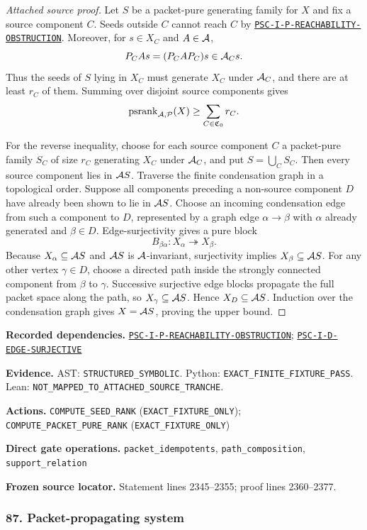 \documentclass[a4paper,11pt]{article}
\newcommand{\field}[2]{\noindent\textbf{#1.} #2\par}
\begin{document}
\begin{proof}[Attached source proof]
Let $S$ be a packet-pure generating family for $X$ and fix a source component $C$.  Seeds outside $C$ cannot reach $C$ by \hyperref[rec:PSC-I-P-REACHABILITY-OBSTRUCTION]{\nolinkurl{PSC-I-P-REACHABILITY-OBSTRUCTION}}.  Moreover, for $s\in X_C$ and $A\in\mathcal A$,
\[
P_CAs=(P_CAP_C)s\in\mathcal A_Cs.
\]
Thus the seeds of $S$ lying in $X_C$ must generate $X_C$ under $\mathcal A_C$, and there are at least $r_C$ of them.  Summing over disjoint source components gives
\[
\operatorname{psrank}_{\mathcal A,\mathcal P}(X)
\geq
\sum_{C\in\mathfrak C_0}r_C.
\]

For the reverse inequality, choose for each source component $C$ a packet-pure family $S_C$ of size $r_C$ generating $X_C$ under $\mathcal A_C$, and put $S=\bigcup_CS_C$.  Then every source component lies in $\mathcal A S$.  Traverse the finite condensation graph in a topological order.  Suppose all components preceding a non-source component $D$ have already been shown to lie in $\mathcal A S$.  Choose an incoming condensation edge from such a component to $D$, represented by a graph edge $\alpha\to\beta$ with $\alpha$ already generated and $\beta\in D$.  Edge-surjectivity gives a pure block
\[
B_{\beta\alpha}:X_\alpha\twoheadrightarrow X_\beta.
\]
Because $X_\alpha\subseteq\mathcal A S$ and $\mathcal A S$ is $\mathcal A$-invariant, surjectivity implies $X_\beta\subseteq\mathcal A S$.  For any other vertex $\gamma\in D$, choose a directed path inside the strongly connected component from $\beta$ to $\gamma$.  Successive surjective edge blocks propagate the full packet space along the path, so $X_\gamma\subseteq\mathcal A S$.  Hence $X_D\subseteq\mathcal A S$.  Induction over the condensation graph gives $X=\mathcal A S$, proving the upper bound.
\end{proof}
\field{Recorded dependencies}{\hyperref[rec:PSC-I-P-REACHABILITY-OBSTRUCTION]{\nolinkurl{PSC-I-P-REACHABILITY-OBSTRUCTION}}; \hyperref[rec:PSC-I-D-EDGE-SURJECTIVE]{\nolinkurl{PSC-I-D-EDGE-SURJECTIVE}}}
\field{Evidence}{AST: \nolinkurl{STRUCTURED_SYMBOLIC}. Python: \nolinkurl{EXACT_FINITE_FIXTURE_PASS}. Lean: \nolinkurl{NOT_MAPPED_TO_ATTACHED_SOURCE_TRANCHE}.}
\field{Actions}{\nolinkurl{COMPUTE_SEED_RANK} (\nolinkurl{EXACT_FIXTURE_ONLY}); \nolinkurl{COMPUTE_PACKET_PURE_RANK} (\nolinkurl{EXACT_FIXTURE_ONLY})}
\field{Direct gate operations}{\nolinkurl{packet_idempotents}, \nolinkurl{path_composition}, \nolinkurl{support_relation}}
\field{Frozen source locator}{Statement lines 2345--2355; proof lines 2360--2377.}
\subsubsection*{87. Packet-propagating system}
\end{document}
